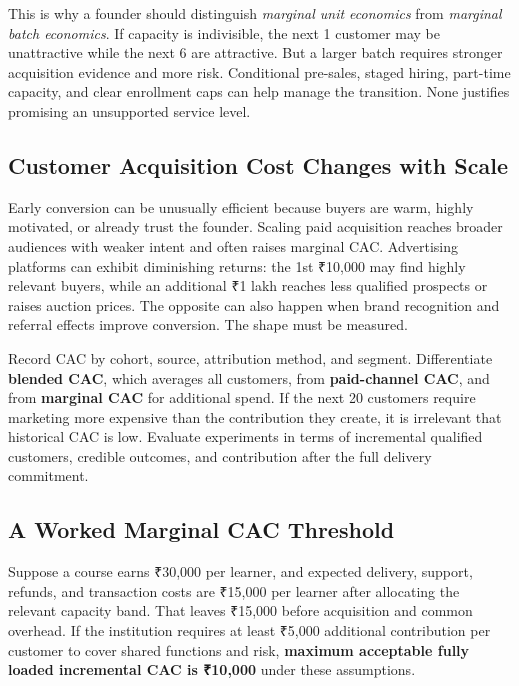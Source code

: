 This is why a founder should distinguish \textit{marginal unit economics} from \textit{marginal batch economics}. If capacity is indivisible, the next 1 customer may be unattractive while the next 6 are attractive. But a larger batch requires stronger acquisition evidence and more risk. Conditional pre-sales, staged hiring, part-time capacity, and clear enrollment caps can help manage the transition. None justifies promising an unsupported service level.

\subsection{Customer Acquisition Cost Changes with Scale}
\label{sec:cac_changes_with_scale}

Early conversion can be unusually efficient because buyers are warm, highly motivated, or already trust the founder. Scaling paid acquisition reaches broader audiences with weaker intent and often raises marginal CAC. Advertising platforms can exhibit diminishing returns: the 1st ₹10,000 may find highly relevant buyers, while an additional ₹1 lakh reaches less qualified prospects or raises auction prices. The opposite can also happen when brand recognition and referral effects improve conversion. The shape must be measured.

Record CAC by cohort, source, attribution method, and segment. Differentiate \textbf{blended CAC}, which averages all customers, from \textbf{paid-channel CAC}, and from \textbf{marginal CAC} for additional spend. If the next 20 customers require marketing more expensive than the contribution they create, it is irrelevant that historical CAC is low. Evaluate experiments in terms of incremental qualified customers, credible outcomes, and contribution after the full delivery commitment.

\subsection{A Worked Marginal CAC Threshold}
\label{sec:worked_marginal_cac_threshold}

Suppose a course earns ₹30,000 per learner, and expected delivery, support, refunds, and transaction costs are ₹15,000 per learner after allocating the relevant capacity band. That leaves ₹15,000 before acquisition and common overhead. If the institution requires at least ₹5,000 additional contribution per customer to cover shared functions and risk, \textbf{maximum acceptable fully loaded incremental CAC is ₹10,000} under these assumptions.

